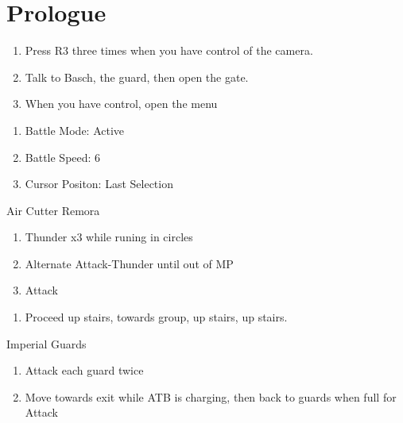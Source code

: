 \chapter{Prologue}
\begin{enumerate}
	\item Press R3 three times when you have control of the camera.
	\item Talk to Basch, the guard, then open the gate.
	\item When you have control, open the menu
\end{enumerate}
\begin{menu}
	\begin{enumerate}
		\item Battle Mode: Active
		\item Battle Speed: 6
		\item Cursor Positon: Last Selection
	\end{enumerate}
\end{menu}
\begin{battle}{Air Cutter Remora}
	\begin{enumerate}
		\item Thunder x3 while runing in circles
		\item Alternate Attack-Thunder until out of MP
		\item Attack
	\end{enumerate}
\end{battle}
\begin{enumerate}
	\item Proceed up stairs, towards group, up stairs, up stairs.
\end{enumerate}
\begin{battle}{Imperial Guards}
	\begin{enumerate}
		\item Attack each guard twice
		\item Move towards exit while ATB is charging, then back to guards when full for Attack
	\end{enumerate}
\end{battle}